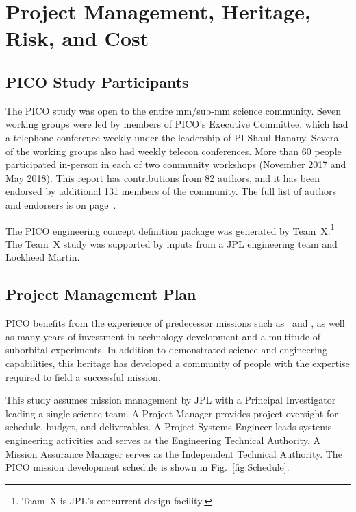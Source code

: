 \bigskip
\section{Project Management, Heritage, Risk, and Cost}
\label{sec:project_management} %

\subsection{PICO Study Participants}
\label{sec:study_participants} %

The PICO study was open to the entire mm/sub-mm science community. Seven working groups were led by members of PICO's Executive Committee, which had a telephone conference weekly under the leadership of PI Shaul Hanany. Several of the working groups also had weekly telecon conferences. More than 60 people participated in-person in each of two community workshops (November 2017 and May 2018). This report has contributions from 82 authors, and it has been endorsed by additional 131 members of the community.  The full list of authors and endorsers is on page~\pageref{authorlist}.


The PICO engineering concept definition package was generated by Team~X.\footnote{\label{teamx} Team~X is JPL's concurrent design facility.} The Team~X study was supported by inputs from a JPL engineering team and Lockheed Martin.


\subsection{Project Management Plan}
\label{sec:management_plan} %

PICO benefits from the experience of predecessor missions such as \planck\ and \wmap, as well as many years of investment in technology development and a multitude of suborbital experiments. In addition to demonstrated science and engineering capabilities, this heritage has developed a community of people with the expertise required to field a successful mission.

This study assumes mission management by JPL with a Principal Investigator leading a single science team. A Project Manager provides project oversight for schedule, budget, and deliverables. A Project Systems Engineer leads systems engineering activities and serves as the Engineering Technical Authority. A Mission Assurance Manager serves as the Independent Technical Authority. The PICO mission development schedule is shown in Fig.~\ref{fig:Schedule}.

